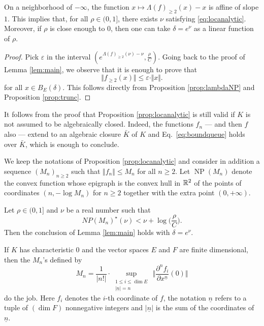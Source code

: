 \documentclass{lms}
\DeclareMathOperator{\NP}{NP}
\begin{document}
\begin{rem}
On a neighborhood of $-\infty$, the function $x \mapsto \Lambda(f)_{\geq 
2} (x) - x$ is affine of slope $1$. This implies that, for all $\rho \in
(0,1]$, there exists $\nu$ satisfying \eqref{eq:locanalytic}. Moreover,
if $\rho$ is close enough to $0$, then one can take $\delta = e^\nu$ as a 
linear function of $\rho$.
\end{rem}

\begin{proof}
Pick $\varepsilon$ in the interval $(e^{\Lambda(f)_{\geq 2} (\nu) - \nu}, 
\frac \rho C)$. Going back to the proof of Lemma \ref{lem:main}, we 
observe that it is enough to prove that
\begin{equation}
\label{eq:boundqueue} 
\Vert f_{\geq 2}(x) \Vert \leq \varepsilon \cdot \Vert x \Vert.
\end{equation}
for all $x \in B_E(\delta)$.
This follows directly from Proposition \ref{prop:lambdaNP} and Proposition
\ref{prop:trunc}.
\end{proof}

\begin{rem}
It follows from the proof that Proposition \ref{prop:locanalytic} is 
still valid if $K$ is not assumed to be algebraically closed. Indeed, 
the functions $f_n$ --- and then $f$ also --- extend to an algebraic
closure $\bar K$ of $K$ and Eq.~\eqref{eq:boundqueue} holds over $\bar 
K$, which is enough to conclude.
\end{rem}

\begin{cor}
We keep the notations of Proposition \ref{prop:locanalytic} and consider 
in addition a sequence $(M_n)_{n \geq 2}$ such that $\Vert f_n \Vert 
\leq M_n$ for all $n \geq 2$. Let $\NP(M_n)$ denote the convex function
whose epigraph is the convex hull in $\mathbb R^2$ of the points of coordinates
$(n, -\log M_n)$ for $n \geq 2$ together with the extra point $(0,
+\infty)$.

Let $\rho \in (0, 1]$ and $\nu$ be a real number such that 
$$NP(M_n)^\star (\nu) < \nu + \log \Big( \frac \rho C \Big).$$
Then the conclusion of Lemma \ref{lem:main} holds with $\delta = e^\nu$.
\end{cor}

\begin{rem}
If $K$ has characteristic $0$ and the vector spaces $E$ and $F$ are
finite dimensional, then the $M_n$'s defined by
$$M_n = \frac 1 {|n!|} \cdot 
\sup_{\substack{1 \leq i \leq \dim E \\ \vert \underline n
\vert = n}} \,
\Big\Vert \frac{\partial^n f_i}{\partial x^{\underline n}}(0) 
\Big\Vert$$
do the job. Here $f_i$ denotes the $i$-th coordinate of $f$, the
notation $\underline n$ refers to a tuple of $(\dim F)$ nonnegative
integers and $\vert \underline n \vert$ is the sum of the coordinates
of $\underline n$.
\end{rem}
\end{document}
